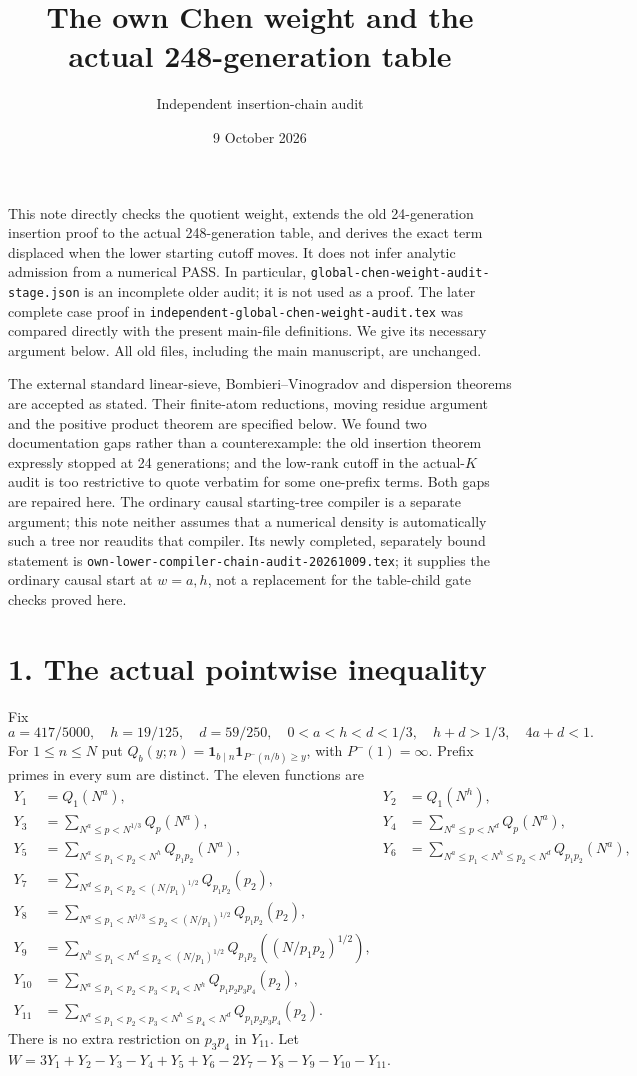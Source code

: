 \documentclass[11pt]{article}
\title{The own Chen weight and the actual 248-generation table}
\author{Independent insertion-chain audit}
\date{9 October 2026}
\newcommand{\ind}{\mathbf1}
\begin{document}
\maketitle

This note directly checks the quotient weight, extends the old 24-generation
insertion proof to the actual 248-generation table, and derives the exact
term displaced when the lower starting cutoff moves. It does not infer
analytic admission from a numerical PASS. In particular,
\texttt{global-chen-weight-audit-stage.json} is an incomplete older audit;
it is not used as a proof. The later complete case proof in
\texttt{independent-global-chen-weight-audit.tex} was compared directly
with the present main-file definitions. We give its necessary argument
below. All old files, including the main manuscript, are unchanged.

The external standard linear-sieve, Bombieri--Vinogradov and dispersion
theorems are accepted as stated. Their finite-atom reductions, moving
residue argument and the positive product theorem are specified below.
We found two documentation gaps rather than a counterexample: the old
insertion theorem expressly stopped at 24 generations; and the low-rank
cutoff in the actual-$K$ audit is too restrictive to quote verbatim for
some one-prefix terms. Both gaps are repaired here. The ordinary causal
starting-tree compiler is a separate argument; this note neither assumes
that a numerical density is automatically such a tree nor reaudits that
compiler. Its newly completed, separately bound statement is
\texttt{own-lower-compiler-chain-audit-20261009.tex}; it supplies the
ordinary causal start at $w=a,h$, not a replacement for the table-child
gate checks proved here.

\section*{1. The actual pointwise inequality}
Fix
\[
 a=417/5000,\quad h=19/125,\quad d=59/250,
 \quad 0<a<h<d<1/3,\quad h+d>1/3,\quad4a+d<1.
\]
For $1\le n\le N$ put
$Q_b(y;n)=\ind_{b\mid n}\ind_{P^-(n/b)\ge y}$, with $P^-(1)=\infty$.
Prefix primes in every sum are distinct. The eleven functions are
\begin{align*}
Y_1&=Q_1(N^a),&Y_2&=Q_1(N^h),\\
Y_3&=\sum_{N^a\le p<N^{1/3}}Q_p(N^a),&
Y_4&=\sum_{N^a\le p<N^d}Q_p(N^a),\\
Y_5&=\sum_{N^a\le p_1<p_2<N^h}Q_{p_1p_2}(N^a),&
Y_6&=\sum_{N^a\le p_1<N^h\le p_2<N^d}Q_{p_1p_2}(N^a),\\
Y_7&=\sum_{N^d\le p_1<p_2<(N/p_1)^{1/2}}Q_{p_1p_2}(p_2),\\
Y_8&=\sum_{N^a\le p_1<N^{1/3}\le p_2<(N/p_1)^{1/2}}Q_{p_1p_2}(p_2),\\
Y_9&=\sum_{N^h\le p_1<N^d\le p_2<(N/p_1)^{1/2}}
 Q_{p_1p_2}((N/p_1p_2)^{1/2}),\\
Y_{10}&=\sum_{N^a\le p_1<p_2<p_3<p_4<N^h}Q_{p_1p_2p_3p_4}(p_2),\\
Y_{11}&=\sum_{N^a\le p_1<p_2<p_3<N^h\le p_4<N^d}Q_{p_1p_2p_3p_4}(p_2).
\end{align*}
There is no extra restriction on $p_3p_4$ in $Y_{11}$.
Let $W=3Y_1+Y_2-Y_3-Y_4+Y_5+Y_6-2Y_7-Y_8-Y_9-Y_{10}-Y_{11}$.
\end{document}
